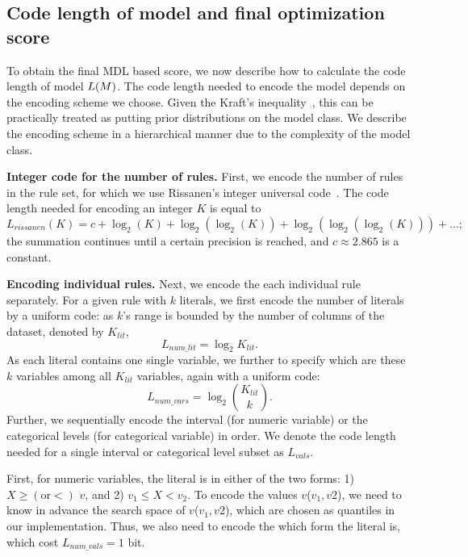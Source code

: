  \subsection{Code length of model and final optimization score} \label{subsec:code_model}
To obtain the final MDL based score, we now describe how to calculate the code length of model $L(M)$. The code length needed to encode the model depends on the encoding scheme we choose. Given the Kraft's inequality~\citep{grunwald2007minimum}, this can be practically treated as putting prior distributions on the model class. We describe the encoding scheme in a hierarchical manner due to the complexity of the model class. 

\noindent \textbf{Integer code for the number of rules.} 
First, we encode the number of rules in the rule set, for which we use Rissanen's integer universal code~\citep{rissanen1983universal}. The code length needed for encoding an integer $K$ is equal to 
$$L_{rissanen}(K) = c + \log_2(K) + \log_2(\log_2(K)) + \log_2(\log_2(\log_2(K))) + \ldots ;$$
the summation continues until a certain precision is reached, and $c \approx 2.865$ is a constant. 

\noindent \textbf{Encoding individual rules.} 
Next, we encode the each individual rule separately. For a given rule with $k$ literals, we first encode the number of literals by a uniform code: as $k$'s range is bounded by the number of columns of the dataset, denoted by $K_{lit}$, 
\begin{equation}
	L_{num\_lit} = \log_2 K_{lit}. 
\end{equation}
As each literal contains one single variable, we further to specify which are these $k$ variables among all $K_{lit}$ variables, again with a uniform code:
\begin{equation}
	L_{num\_vars} = \log_2 {K_{lit} \choose k}. 
\end{equation}
Further, we sequentially encode the interval (for numeric variable) or the categorical levels (for categorical variable) in order. We denote the code length needed for a single interval or categorical level subset as $L_{vals}$.  

First, for numeric variables, the literal is in either of the two forms: 1) $X \geq (\text{or} <)$ $v$, and 2) $v_1  \leq X < v_2$. To encode the values $v$($v_1, v2$), we need to know in advance the search space of $v$($v_1, v2$), which are chosen as quantiles in our implementation. Thus, we also need to encode the which form the literal is, which cost $L_{num\_vals} = 1$ bit. 

